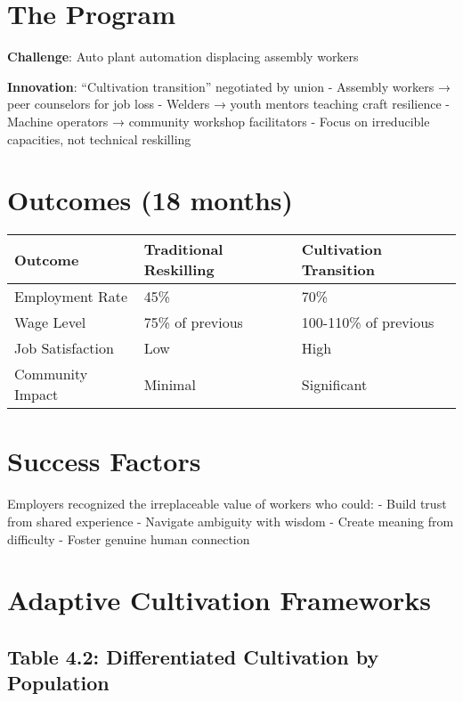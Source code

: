 \documentclass[
  a4paper,
]{report}
\begin{document}
\section{The Program}

\textbf{Challenge}: Auto plant automation displacing assembly workers

\textbf{Innovation}: ``Cultivation transition'' negotiated by union -
Assembly workers → peer counselors for job loss - Welders → youth
mentors teaching craft resilience - Machine operators → community
workshop facilitators - Focus on irreducible capacities, not technical
reskilling

\section{Outcomes (18 months)}

\begin{longtable}[]{@{}lll@{}}
\toprule\noalign{}
Outcome & Traditional Reskilling & Cultivation Transition \\
\midrule\noalign{}
\endhead
\bottomrule\noalign{}
\endlastfoot
Employment Rate & 45\% & 70\% \\
Wage Level & 75\% of previous & 100-110\% of previous \\
Job Satisfaction & Low & High \\
Community Impact & Minimal & Significant \\
\end{longtable}

\section{Success Factors}

Employers recognized the irreplaceable value of workers who could: -
Build trust from shared experience - Navigate ambiguity with wisdom -
Create meaning from difficulty - Foster genuine human connection

\section{Adaptive Cultivation
Frameworks}\label{adaptive-cultivation-frameworks}

\subsection{Table 4.2: Differentiated Cultivation by
Population}\label{table-4.2-differentiated-cultivation-by-population}
\end{document}
